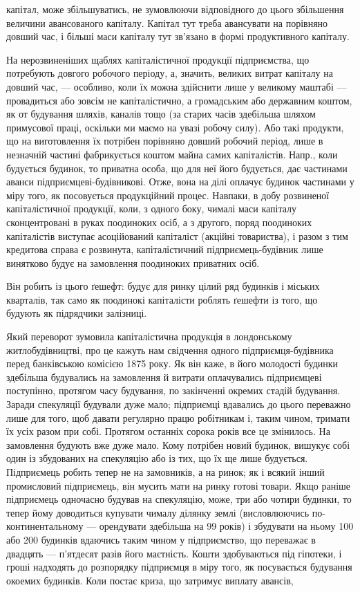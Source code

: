 \parcont{}  %
капітал, може збільшуватись, не зумовлюючи відповідного до цього збільшення
величини авансованого капіталу. Капітал тут треба авансувати на
порівняно довший час, і більші маси капіталу тут зв’язано в формі продуктивного
капіталу.

На нерозвиненіших щаблях капіталістичної продукції підприємства,
що потребують довгого робочого періоду, а, значить, великих витрат капіталу
на довший час, — особливо, коли їх можна здійснити лише у великому
маштабі — провадиться або зовсім не капіталістично, а громадським
або державним коштом, як от будування шляхів, каналів тощо (за старих
часів здебільша шляхом примусової праці, оскільки ми маємо
на увазі робочу силу). Або такі продукти, що на виготовлення їх потрібен
порівняно довший робочий період, лише в незначній частині фабрикується
коштом майна самих капіталістів. Напр., коли будується будинок,
то приватна особа, що для неї його будується, дає частинами аванси
підприємцеві-будівникові. Отже, вона на ділі оплачує будинок частинами
у міру того, як посовується продукційний процес. Навпаки, в добу розвиненої
капіталістичної продукції, коли, з одного боку, чималі маси капіталу
сконцентровані в руках поодиноких осіб, а з другого, поряд поодиноких
капіталістів виступає асоційований капіталіст (акційні товариства),
і разом з тим кредитова справа є розвинута, капіталістичний
підприємець-будівник лише винятково будує на замовлення поодиноких
приватних осіб.

Він робить із цього ґешефт: будує для ринку цілий ряд будинків і
міських кварталів, так само як поодинокі капіталісти роблять ґешефти
із того, що будують як підрядчики залізниці.

Який переворот зумовила капіталістична продукція в лондонському
житлобудівництві, про це кажуть нам свідчення одного підприємця-будівника
перед банківською комісією 1875 року. Як він каже, в його
молодості будинки здебільша будувались на замовлення й витрати оплачувались
підприємцеві поступінно, протягом часу будування, по закінченні
окремих стадій будування. Заради спекуляції будували дуже мало;
підприємці вдавались до цього переважно лише для того, щоб давати
регулярно працю робітникам і, таким чином, тримати їх усіх разом при
собі. Протягом останніх сорока років все це змінилось. На замовлення
будують вже дуже мало. Кому потрібен новий будинок, вишукує
собі один із збудованих на спекуляцію або із тих, що їх ще лише будується.
Підприємець робить тепер не на замовників, а на ринок; як і
всякий інший промисловий підприємець, він мусить мати на ринку
готові товари. Якщо раніше підприємець одночасно будував на спекуляцію,
може, три або чотири будинки, то тепер йому доводиться купувати
чималу ділянку землі (висловлюючись по-континентальному — орендувати
здебільша на 99 років) і збудувати на ньому 100 або 200 будинків
вдаючись таким чином у підприємство, що переважає в двадцять — п’ятдесят
разів його маєтність. Кошти здобуваються під гіпотеки, і гроші
надходять до розпорядку підприємця в міру того, як посувається будування
окоемих будинків. Коли постає криза, що затримує виплату авансів,
\parbreak{}  %
